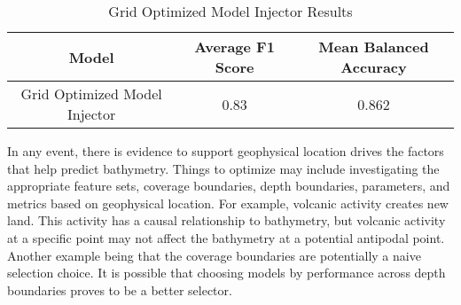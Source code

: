 \begin{table}[htb]
    \centering
    \begin{tabular}{|c c c|}
        \hline
        \textbf{Model} & \textbf{Average F1 Score} & \textbf{Mean Balanced Accuracy} \\
		\hline
		Grid Optimized Model Injector & 0.83 & 0.862 \\
		\hline
    \end{tabular}
    \label{table:GRID_OPT_RESULTS}
    \caption{Grid Optimized Model Injector Results}
\end{table}

\par
In any event, there is evidence to support geophysical location drives the factors that help predict bathymetry.
Things to optimize may include investigating the appropriate feature sets, coverage boundaries, depth boundaries, parameters, and metrics based on geophysical location.
For example, volcanic activity creates new land.
This activity has a causal relationship to bathymetry, but volcanic activity at a specific point may not affect the bathymetry at a potential antipodal point.
Another example being that the coverage boundaries are potentially a naive selection choice.
It is possible that choosing models by performance across depth boundaries proves to be a better selector.

